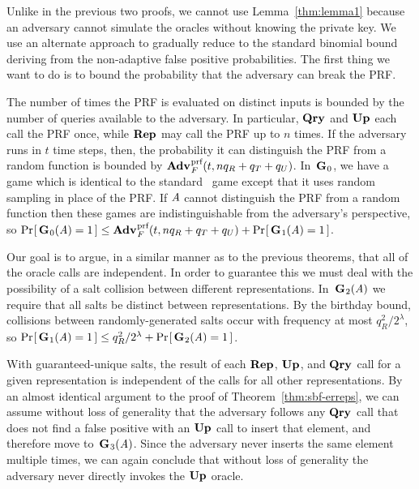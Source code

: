 Unlike in the previous two proofs, we cannot use Lemma~\ref{thm:lemma1} because an adversary cannot simulate the oracles without knowing the private key. We use an alternate approach to gradually reduce to the standard binomial bound deriving from the non-adaptive false positive probabilities. The first thing we want to do is to bound the probability that the adversary can break the PRF.

The number of times the PRF is evaluated on distinct inputs is bounded by the number of queries available to the adversary. In particular, $\textup{\textbf{Qry}}\hspace{0.5pt}$ and $\textup{\textbf{Up}}\hspace{0.5pt}$ each call the PRF once, while $\textup{\textbf{Rep}}\hspace{0.5pt}$ may call the PRF up to $n$ times. If the adversary runs in $t$ time steps, then, the probability it can distinguish the PRF from a random function is bounded by $\Adv{\prf}_F(t,nq_R+q_T+q_U)$. In~$\textup{\textbf{G}}\hspace{0.5pt}_0$, we have a game which is identical to the standard \errep\ game except that it uses random sampling in place of the PRF. If $\mathit{A}$ cannot distinguish the PRF from a random function then these games are indistinguishable from the adversary's perspective, so $\Prob{\game_0(\advA) = 1} \le \Adv{\prf}_F(t,nq_R+q_T+q_U) + \Prob{\game_1(\advA) = 1}$.

Our goal is to argue, in a similar manner as to the previous theorems, that all of the oracle calls are independent. In order to guarantee this we must deal with the possibility of a salt collision between different representations. In~$\textup{\textbf{G}}\hspace{0.5pt}_2(\mathit{A})$ we require that all salts be distinct between representations. By the birthday bound, collisions between randomly-generated salts occur with frequency at most $q_R^2/2^\lambda$, so $\Pr\hspace{-1pt}\left[\,\textup{\textbf{G}}\hspace{0.5pt}_1(\mathit{A}) = 1\,\right] \le q_R^2/2^\lambda + \Pr\hspace{-1pt}\left[\,\textup{\textbf{G}}\hspace{0.5pt}_2(\mathit{A}) = 1\,\right]$.

With guaranteed-unique salts, the result of each $\textup{\textbf{Rep}}\hspace{0.5pt}$, $\textup{\textbf{Up}}\hspace{0.5pt}$, and $\textup{\textbf{Qry}}\hspace{0.5pt}$ call for a given representation is independent of the calls for all other representations. By an almost identical argument to the proof of Theorem~\ref{thm:sbf-erreps}, we can assume without loss of generality that the adversary follows any $\textup{\textbf{Qry}}\hspace{0.5pt}$ call that does not find a false positive with an $\textup{\textbf{Up}}\hspace{0.5pt}$ call to insert that element, and therefore move to~$\textup{\textbf{G}}\hspace{0.5pt}_3(\mathit{A})$. Since the adversary never inserts the same element multiple times, we can again conclude that without loss of generality the adversary never directly invokes the $\textup{\textbf{Up}}\hspace{0.5pt}$ oracle.

